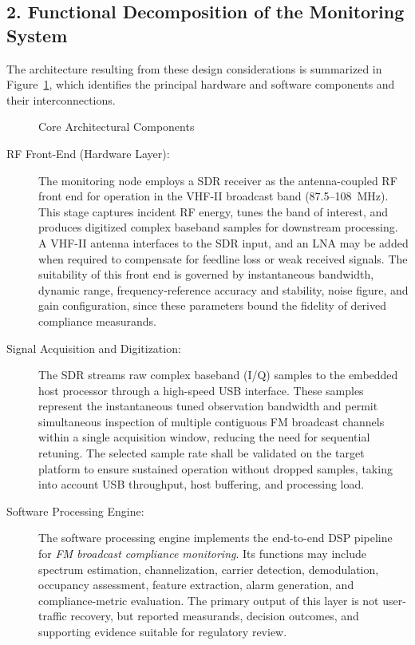 \documentclass[11pt]{report}
\begin{document}
\subsection*{2. Functional Decomposition of the Monitoring System}\;

\noindent
The architecture resulting from these design considerations is summarized in Figure~\ref{fig:Architecture}, which identifies the principal hardware and software components and their interconnections.

\begin{figure}[!ht]
	
	\caption{Core Architectural Components}\label{fig:Architecture}
\end{figure}

\begin{description}
	\item[RF Front-End (Hardware Layer):]
	The monitoring node employs a SDR receiver as the antenna-coupled RF front end for operation in the VHF-II broadcast band (87.5--108~MHz). This stage captures incident RF energy, tunes the band of interest, and produces digitized complex baseband samples for downstream processing. A VHF-II antenna interfaces to the SDR input, and an LNA may be added when required to compensate for feedline loss or weak received signals. The suitability of this front end is governed by instantaneous bandwidth, dynamic range, frequency-reference accuracy and stability, noise figure, and gain configuration, since these parameters bound the fidelity of derived compliance measurands. 
	
	\item[Signal Acquisition and Digitization:]
	The SDR streams raw complex baseband (I/Q) samples to the embedded host processor through a high-speed USB interface. These samples represent the instantaneous tuned observation bandwidth and permit simultaneous inspection of multiple contiguous FM broadcast channels within a single acquisition window, reducing the need for sequential retuning. The selected sample rate shall be validated on the target platform to ensure sustained operation without dropped samples, taking into account USB throughput, host buffering, and processing load.
	
	\item[Software Processing Engine:]
	The software processing engine implements the end-to-end DSP pipeline for \emph{FM broadcast compliance monitoring}. Its functions may include spectrum estimation, channelization, carrier detection, demodulation, occupancy assessment, feature extraction, alarm generation, and compliance-metric evaluation. The primary output of this layer is not user-traffic recovery, but reported measurands, decision outcomes, and supporting evidence suitable for regulatory review.
	

\end{description}
\end{document}
